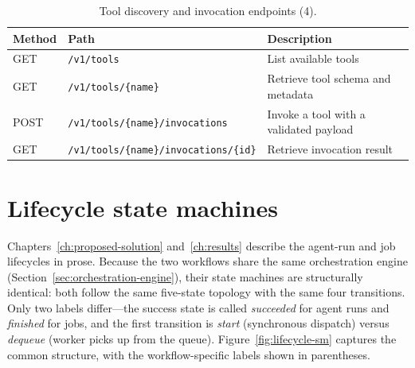 \documentclass[a4paper,noexaminfo]{sapthesis}
\begin{document}
\begin{table}[ht]
\centering
\caption{Tool discovery and invocation endpoints (4).}
\label{tab:app-tool-ep}
\small
\begin{tabularx}{\textwidth}{@{}l l X@{}}
    \hline
    \textbf{Method} & \textbf{Path} & \textbf{Description} \\
    \hline
    GET  & \texttt{/v1/tools}                              & List available tools \\
    GET  & \texttt{/v1/tools/\{name\}}                     & Retrieve tool schema and metadata \\
    POST & \texttt{/v1/tools/\{name\}/invocations}         & Invoke a tool with a validated payload \\
    GET  & \texttt{/v1/tools/\{name\}/invocations/\{id\}}  & Retrieve invocation result \\
    \hline
\end{tabularx}
\end{table}


\section{Lifecycle state machines}
\label{app:extra-diagrams}

Chapters~\ref{ch:proposed-solution} and~\ref{ch:results} describe the
agent-run and job lifecycles in prose.  Because the two workflows share
the same orchestration engine (Section~\ref{sec:orchestration-engine}),
their state machines are structurally identical: both follow the same
five-state topology with the same four transitions.  Only two labels
differ---the success state is called \emph{succeeded} for agent runs
and \emph{finished} for jobs, and the first transition is \emph{start}
(synchronous dispatch) versus \emph{dequeue} (worker picks up from the
queue).  Figure~\ref{fig:lifecycle-sm} captures the common structure,
with the workflow-specific labels shown in parentheses.
\end{document}
